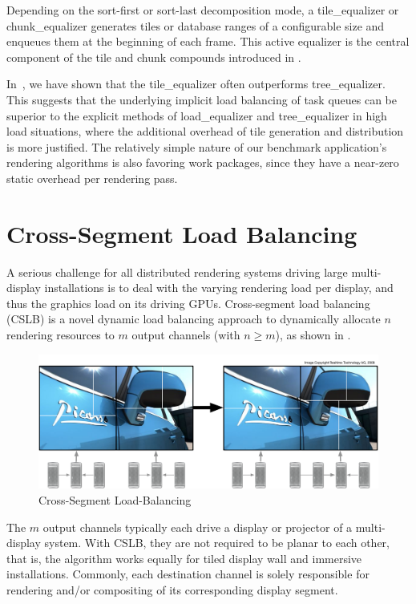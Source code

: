 Depending on the sort-first or sort-last decomposition mode, a
\textsf{tile\_equalizer} or \textsf{chunk\_equalizer} generates tiles or
database ranges of a configurable size and enqueues them at the beginning of
each frame. This active equalizer is the central component of the tile and chunk
compounds introduced in .

In~\cite{SPEP:16}, we have shown that the \textsf{tile\_equalizer} often
outperforms \textsf{tree\_equalizer}. This suggests that the underlying implicit
load balancing of task queues can be superior to the explicit methods of
\textsf{load\_equalizer} and \textsf{tree\_equalizer} in high load situations,
where the additional overhead of tile generation and distribution is more
justified. The relatively simple nature of our benchmark application's rendering
algorithms is also favoring work packages, since they have a near-zero static
overhead per rendering pass.


\section{Cross-Segment Load Balancing}

A serious challenge for all distributed rendering systems driving large
multi-display installations is to deal with the varying rendering load per
display, and thus the graphics load on its driving GPUs. Cross-segment load
balancing (CSLB) is a novel dynamic load balancing approach to dynamically
allocate $n$ rendering resources to $m$ output channels (with $n\geq m$), as
shown in .

\begin{figure}
  \includegraphics[width=.382\textwidth]{images/vieweq}
  \caption{\label{fvieweq}Cross-Segment Load-Balancing}
\end{figure}

The $m$ output channels typically each drive a display or projector of a
multi-display system. With CSLB, they are not required to be planar to each
other, that is, the algorithm works equally for tiled display wall and immersive
installations. Commonly, each destination channel is solely responsible for
rendering and/or compositing of its corresponding display segment.

